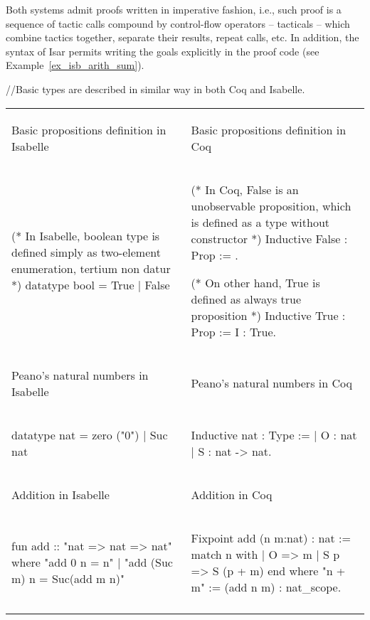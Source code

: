 \documentclass[article]{aaltoseries}
\begin{document}
Both systems admit proofs written in imperative fashion, i.e., such proof is a sequence of tactic calls compound by control-flow operators -- tacticals -- which combine tactics together, separate their results, repeat calls, etc. In addition, the syntax of Isar permits writing the goals explicitly in the proof code (see Example~\ref{ex_isb_arith_sum}).

//Basic types are described in similar way in both Coq and Isabelle. 

\bgroup
\def\arraystretch{0}%
\begin{tabular}{p{.45\linewidth} p{.45\linewidth}}

\begin{center}Basic propositions definition in Isabelle\end{center}  &  \begin{center}Basic propositions definition in Coq\end{center} \\
\begin{isabelle}
(* In Isabelle, boolean type is defined simply as two-element enumeration, tertium non datur *)
datatype bool = True | False
\end{isabelle}
&
\begin{coq}
(* In Coq, False is an unobservable proposition, which is defined as a type without constructor *)
Inductive False : Prop := .

(* On other hand, True is defined as always true proposition *)
Inductive True : Prop := I : True.
\end{coq}
\\ \arrayrulecolor{gray}\hline
\begin{center}Peano's natural numbers in Isabelle\end{center}  &  \begin{center}Peano's natural numbers in Coq\end{center} \\
\begin{isabelle}
datatype nat = 
    zero ("0")
  | Suc nat
\end{isabelle}
&
\begin{coq}
Inductive nat : Type :=
    | O : nat
    | S : nat -> nat.
\end{coq}
\\ \arrayrulecolor{gray}\hline
\begin{center}Addition in Isabelle\end{center}  &  \begin{center}Addition in Coq\end{center} \\
\begin{isabelle}
fun add :: "nat => nat => nat" where
    "add 0 n = n"
  | "add (Suc m) n = Suc(add m n)"
\end{isabelle}
&
\begin{coq}
Fixpoint add (n m:nat) : nat :=
  match n with
  | O => m
  | S p => S (p + m)
  end
where "n + m" := (add n m) : nat_scope.
\end{coq}
\\ \arrayrulecolor{gray}\hline


\end{tabular}
\end{document}
